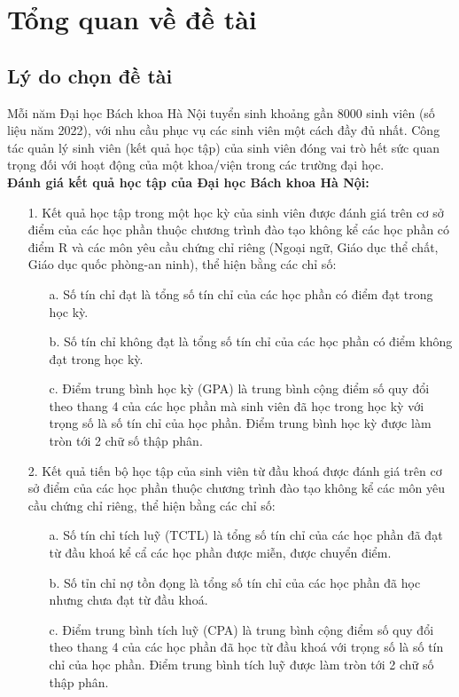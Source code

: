 \chapter{Tổng quan về đề tài}
\section{Lý do chọn đề tài}
Mỗi năm Đại học Bách khoa Hà Nội tuyển sinh khoảng gần 8000 sinh viên (số liệu năm 2022), với nhu cầu phục vụ các sinh viên một cách đầy đủ nhất.
Công tác quản lý sinh viên (kết quả học tập) của sinh viên đóng vai trò hết sức quan trọng đối với hoạt động của một khoa/viện trong các trường đại học. \\

\textbf{Đánh giá kết quả học tập của Đại học Bách khoa Hà Nội:}\textsuperscript{\cite{daotao}}
\begin{itemize}
	\item[1.] Kết quả học tập trong một học kỳ của sinh viên được đánh giá trên cơ sở điểm của các học phần thuộc chương trình đào tạo không kể các học phần có điểm R và các môn yêu cầu chứng chỉ riêng (Ngoại ngữ, Giáo dục thể chất, Giáo dục quốc phòng-an ninh), thể hiện bằng các chỉ số:
		\begin{itemize}
			\item[a.] Số tín chỉ đạt là tổng số tín chỉ của các học phần có điểm đạt trong học kỳ.
			\item[b.] Số tín chỉ không đạt là tổng số tín chỉ của các học phần có điểm không đạt trong học kỳ.
			\item[c.] Điểm trung bình học kỳ (GPA) là trung bình cộng điểm số quy đổi theo thang 4 của các học phần mà sinh viên đã học trong học kỳ với trọng số là số tín chỉ của học phần. Điểm trung bình học kỳ được làm tròn tới 2 chữ số thập phân.
		\end{itemize}
	\item[2.] Kết quả tiến bộ học tập của sinh viên từ đầu khoá được đánh giá trên cơ sở điểm của các học phần thuộc chương trình đào tạo không kể các môn yêu cầu chứng chỉ riêng, thể hiện bằng các chỉ số:
		\begin{itemize}
			\item[a.] Số tín chỉ tích luỹ (TCTL) là tổng số tín chỉ của các học phần đã đạt từ đầu khoá kể cẩ các học phần được miễn, được chuyển điểm.
			\item[b.] Số tỉn chỉ nợ tồn đọng là tổng số tín chỉ của các học phần đã học nhưng chưa đạt từ đầu khoá.
			\item[c.] Điểm trung bình tích luỹ (CPA) là trung bình cộng điểm số quy đổi theo thang 4 của các học phần đã học từ đầu khoá với trọng số là số tín chỉ của học phần. Điểm trung bình tích luỹ được làm tròn tới 2 chữ số thập phân.

\end{itemize}
\end{itemize}
